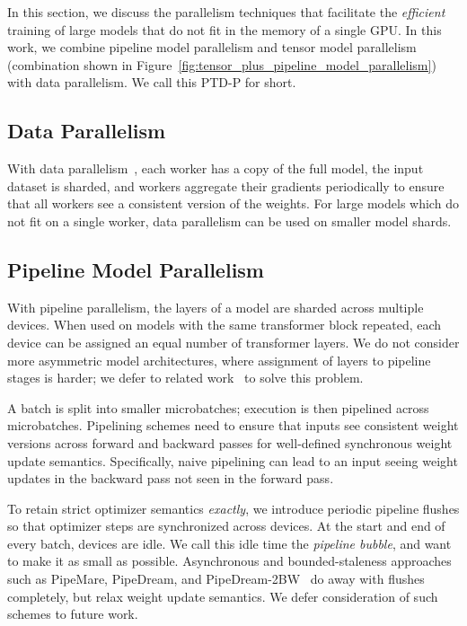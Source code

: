 In this section, we discuss the parallelism techniques that facilitate the \emph{efficient} training of large models that do not fit in the memory of a single GPU. In this work, we combine pipeline model parallelism and tensor model parallelism (combination shown in Figure~\ref{fig:tensor_plus_pipeline_model_parallelism}) with data parallelism. We call this PTD-P for short.

\subsection{Data Parallelism}

With data parallelism~\cite{xing2015petuum, pytorchdistributed}, each worker has a copy of the full model, the input dataset is sharded, and workers aggregate their gradients periodically to ensure that all workers see a consistent version of the weights. For large models which do not fit on a single worker, data parallelism can be used on smaller model shards.

\subsection{Pipeline Model Parallelism}

With pipeline parallelism, the layers of a model are sharded across multiple devices. When used on models with the same transformer block repeated, each device can be assigned an equal number of transformer layers. We do not consider more asymmetric model architectures, where assignment of layers to pipeline stages is harder; we defer to related work~\cite{narayanan2019pipedream, flexflow, tarnawski2020efficient} to solve this problem.

A batch is split into smaller microbatches; execution is then pipelined across microbatches. Pipelining schemes need to ensure that inputs see consistent weight versions across forward and backward passes for well-defined synchronous weight update semantics. Specifically, naive pipelining can lead to an input seeing weight updates in the backward pass not seen in the forward pass.

To retain strict optimizer semantics \emph{exactly}, we introduce periodic pipeline flushes so that optimizer steps are synchronized across devices. At the start and end of every batch, devices are idle. We call this idle time the \emph{pipeline bubble}, and want to make it as small as possible. Asynchronous and bounded-staleness approaches such as PipeMare, PipeDream, and PipeDream-2BW~\cite{yang2021pipemare, pb2021kosson, narayanan2019pipedream, narayanan2021memory} do away with flushes completely, but relax weight update semantics. We defer consideration of such schemes to future work.

